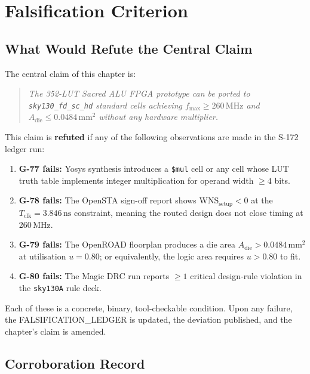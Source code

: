 \section{Falsification Criterion}
\label{sec:72:falsification}

\subsection{What Would Refute the Central Claim}
\label{subsec:72:refutation}

The central claim of this chapter is:
\begin{quote}
\emph{The 352-LUT Sacred ALU FPGA prototype can be ported to
\texttt{sky130\_fd\_sc\_hd} standard cells achieving $f_{\max} \ge 260\,\mathrm{MHz}$
and $A_{\text{die}} \le 0.0484\,\mathrm{mm}^2$ without any hardware multiplier.}
\end{quote}

This claim is \textbf{refuted} if any of the following observations
are made in the S-172 ledger run:

\begin{enumerate}
  \item \textbf{G-77 fails:} Yosys synthesis introduces a \texttt{\$mul} cell
    or any cell whose LUT truth table implements integer multiplication
    for operand width $\ge 4$ bits.
  \item \textbf{G-78 fails:} The OpenSTA sign-off report shows
    $\mathrm{WNS}_{\text{setup}} < 0$ at the $T_{\text{clk}} = 3.846\,\mathrm{ns}$ constraint,
    meaning the routed design does not close timing at 260\,MHz.
  \item \textbf{G-79 fails:} The OpenROAD floorplan produces a die area
    $A_{\text{die}} > 0.0484\,\mathrm{mm}^2$ at utilisation $u = 0.80$;
    or equivalently, the logic area requires $u > 0.80$ to fit.
  \item \textbf{G-80 fails:} The Magic DRC run reports
    $\ge 1$ critical design-rule violation in the \texttt{sky130A} rule deck.
\end{enumerate}

Each of these is a concrete, binary, tool-checkable condition.
Upon any failure, the FALSIFICATION\_LEDGER is updated, the deviation
published, and the chapter's claim is amended.

\subsection{Corroboration Record}
\label{subsec:72:corroboration}

